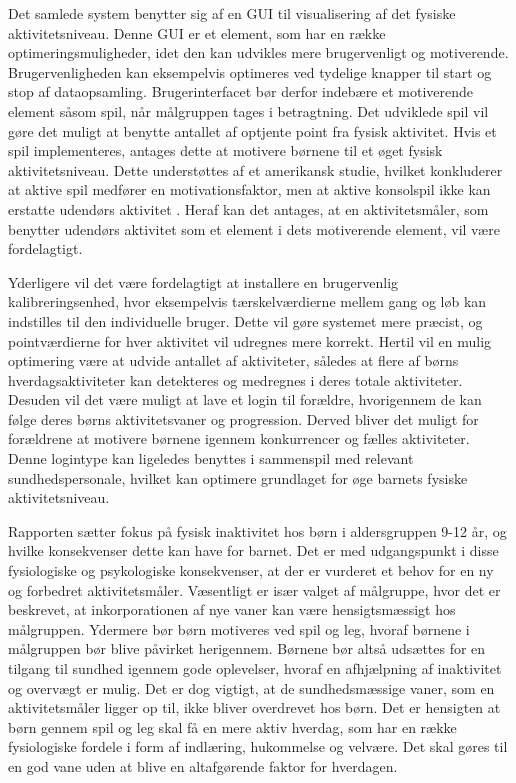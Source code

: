 Det samlede system benytter sig af en GUI til visualisering af det fysiske aktivitetsniveau. Denne GUI er et element, som har en række optimeringsmuligheder, idet den kan udvikles mere brugervenligt og motiverende. Brugervenligheden kan eksempelvis optimeres ved tydelige knapper til start og stop af dataopsamling. Brugerinterfacet bør derfor indebære et motiverende element såsom spil, når målgruppen tages i betragtning. Det udviklede spil vil gøre det muligt at benytte antallet af optjente point fra fysisk aktivitet. Hvis et spil implementeres, antages dette at motivere børnene til et øget fysisk aktivitetsniveau. Dette understøttes af et amerikansk studie, hvilket konkluderer at aktive spil medfører en motivationsfaktor, men at aktive konsolspil ikke kan erstatte udendørs aktivitet \citep{Oestergaard2012}. Heraf kan det antages, at en aktivitetsmåler, som benytter udendørs aktivitet som et element i dets motiverende element, vil være fordelagtigt.

Yderligere vil det være fordelagtigt at installere en brugervenlig kalibreringsenhed, hvor eksempelvis tærskelværdierne mellem gang og løb kan indstilles til den individuelle bruger. Dette vil gøre systemet mere præcist, og pointværdierne for hver aktivitet vil udregnes mere korrekt. Hertil vil en mulig optimering være at udvide antallet af aktiviteter, således at flere af børns hverdagsaktiviteter kan detekteres og medregnes i deres totale aktiviteter. Desuden vil det være muligt at lave et login til forældre, hvorigennem de kan følge deres børns aktivitetsvaner og progression. Derved bliver det muligt for forældrene at motivere børnene igennem konkurrencer og fælles aktiviteter. Denne logintype kan ligeledes benyttes i sammenspil med relevant sundhedspersonale, hvilket kan optimere grundlaget for øge barnets fysiske aktivitetsniveau.

Rapporten sætter fokus på fysisk inaktivitet hos børn i aldersgruppen 9-12 år, og hvilke konsekvenser dette kan have for barnet. Det er med udgangspunkt i disse fysiologiske og psykologiske konsekvenser, at der er vurderet et behov for en ny og forbedret aktivitetsmåler. Væsentligt er især valget af målgruppe, hvor det er beskrevet, at inkorporationen af nye vaner kan være hensigtsmæssigt hos målgruppen. Ydermere bør børn motiveres ved spil og leg, hvoraf børnene i målgruppen bør blive påvirket herigennem. Børnene bør altså udsættes for en tilgang til sundhed igennem gode oplevelser, hvoraf en afhjælpning af inaktivitet og overvægt er mulig. Det er dog vigtigt, at de sundhedsmæssige vaner, som en aktivitetsmåler ligger op til, ikke bliver overdrevet hos børn. Det er hensigten at børn gennem spil og leg skal få en mere aktiv hverdag, som har en række fysiologiske fordele i form af indlæring, hukommelse og velvære. Det skal gøres til en god vane uden at blive en altafgørende faktor for hverdagen.